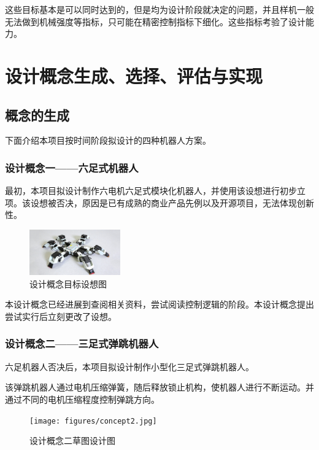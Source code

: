 \documentclass[a4paper]{ctexart}
\numberwithin{equation}{section}
\numberwithin{table}{section}
\numberwithin{figure}{section}
\begin{document}
这些目标基本是可以同时达到的，但是均为设计阶段就决定的问题，并且样机一般无法做到机械强度等指标，只可能在精密控制指标下细化。这些指标考验了设计能力。

\section{设计概念生成、选择、评估与实现}


\subsection{概念的生成}

下面介绍本项目按时间阶段拟设计的四种机器人方案。

\subsubsection{设计概念一——六足式机器人}

最初，本项目拟设计制作六电机六足式模块化机器人，并使用该设想进行初步立项。该设想被否决，原因是已有成熟的商业产品先例以及开源项目，无法体现创新性。

\begin{figure}[H]
  \begin{center}
    \includegraphics[width=0.35\textwidth]{figures/sixfeet.jpeg}
  \end{center}
  \label{fig_concept_1}
  \caption{设计概念目标设想图}
\end{figure}

本设计概念已经进展到查阅相关资料，尝试阅读控制逻辑的阶段。本设计概念提出尝试实行后立刻更改了设想。


\subsubsection{设计概念二——三足式弹跳机器人}

六足机器人否决后，本项目拟设计制作小型化三足式弹跳机器人。

该弹跳机器人通过电机压缩弹簧，随后释放锁止机构，使机器人进行不断运动。并通过不同的电机压缩程度控制弹跳方向。

\begin{figure}[H]
  \begin{center}
    \texttt{[image: figures/concept2.jpg]}
  \end{center}
  \label{fig_concept_2}
  \caption{设计概念二草图设计图}
\end{figure}
\end{document}
